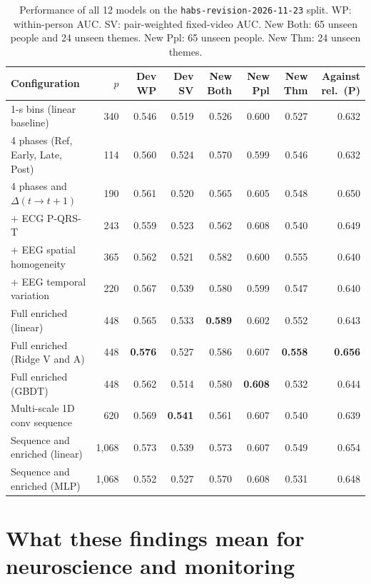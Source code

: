 \documentclass[10pt]{article}
\begin{document}
\begin{table}[t]
\centering\footnotesize
\begin{tabular}{@{}lrrrrrrr@{}}
\toprule
Configuration & $p$ & Dev WP & Dev SV & New Both & New Ppl & New Thm & Against rel.\ (P)\\
\midrule
1-s bins (linear baseline) & 340 & 0.546 & 0.519 & 0.526 & 0.600 & 0.527 & 0.632\\
4 phases (Ref, Early, Late, Post) & 114 & 0.560 & 0.524 & 0.570 & 0.599 & 0.546 & 0.632\\
4 phases and $\Delta(t\to t+1)$ & 190 & 0.561 & 0.520 & 0.565 & 0.605 & 0.548 & 0.650\\
\quad $+$ ECG P-QRS-T & 243 & 0.559 & 0.523 & 0.562 & 0.608 & 0.540 & 0.649\\
\quad $+$ EEG spatial homogeneity & 365 & 0.562 & 0.521 & 0.582 & 0.600 & 0.555 & 0.640\\
\quad $+$ EEG temporal variation & 220 & 0.567 & 0.539 & 0.580 & 0.599 & 0.547 & 0.640\\
Full enriched (linear) & 448 & 0.565 & 0.533 & \textbf{0.589} & 0.602 & 0.552 & 0.643\\
Full enriched (Ridge V and A) & 448 & \textbf{0.576} & 0.527 & 0.586 & 0.607 & \textbf{0.558} & \textbf{0.656}\\
Full enriched (GBDT) & 448 & 0.562 & 0.514 & 0.580 & \textbf{0.608} & 0.532 & 0.644\\
Multi-scale 1D conv sequence & 620 & 0.569 & \textbf{0.541} & 0.561 & 0.607 & 0.540 & 0.639\\
Sequence and enriched (linear) & 1,068 & 0.573 & 0.539 & 0.573 & 0.607 & 0.549 & 0.654\\
Sequence and enriched (MLP) & 1,068 & 0.552 & 0.527 & 0.570 & 0.608 & 0.531 & 0.648\\
\bottomrule
\end{tabular}
\caption{Performance of all 12 models on the \texttt{habs-revision-2026-11-23} split. WP: within-person AUC. SV: pair-weighted fixed-video AUC. New Both: 65 unseen people and 24 unseen themes. New Ppl: 65 unseen people. New Thm: 24 unseen themes.}
\label{tab:seq_models}
\end{table}

\section{What these findings mean for neuroscience and monitoring}
\end{document}
